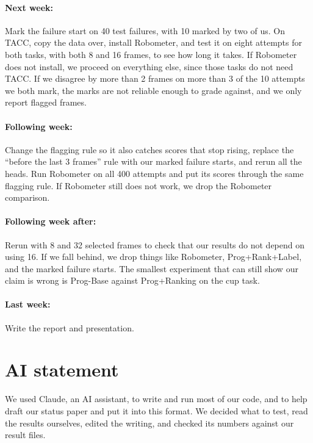 \documentclass{article}
\begin{document}
\paragraph{Next week:} Mark the failure start on 40 test failures, with 10 marked by two of us. On TACC, copy the data over, install Robometer, and test it on eight attempts for both tasks, with both 8 and 16 frames, to see how long it takes. If Robometer does not install, we proceed on everything else, since those tasks do not need TACC. If we disagree by more than 2 frames on more than 3 of the 10 attempts we both mark, the marks are not reliable enough to grade against, and we only report flagged frames.

\paragraph{Following week:} Change the flagging rule so it also catches scores that stop rising, replace the ``before the last 3 frames'' rule with our marked failure starts, and rerun all the heads. Run Robometer on all 400 attempts and put its scores through the same flagging rule. If Robometer still does not work, we drop the Robometer comparison.

\paragraph{Following week after:} Rerun with 8 and 32 selected frames to check that our results do not depend on using 16. If we fall behind, we drop things like Robometer, Prog+Rank+Label, and the marked failure starts. The smallest experiment that can still show our claim is wrong is Prog-Base against Prog+Ranking on the cup task.

\paragraph{Last week:} Write the report and presentation.


\section{AI statement}
We used Claude, an AI assistant, to write and run most of our code, and to help draft our status paper and put it into this format. We decided what to test, read the results ourselves, edited the writing, and checked its numbers against our result files.
\end{document}

